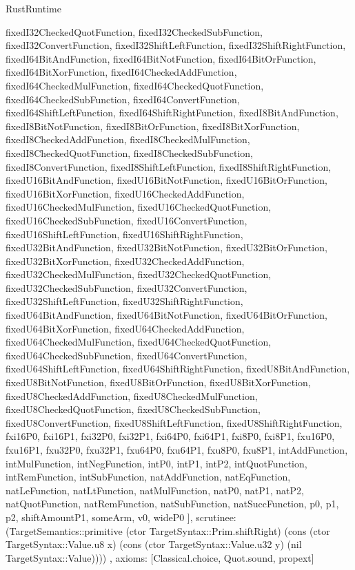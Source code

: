 \begin{lexlean}{RustRuntime}
\begin{semanticmodule}
{{      fixedI32CheckedQuotFunction,
      fixedI32CheckedSubFunction,
      fixedI32ConvertFunction,
      fixedI32ShiftLeftFunction,
      fixedI32ShiftRightFunction,
      fixedI64BitAndFunction,
      fixedI64BitNotFunction,
      fixedI64BitOrFunction,
      fixedI64BitXorFunction,
      fixedI64CheckedAddFunction,
      fixedI64CheckedMulFunction,
      fixedI64CheckedQuotFunction,
      fixedI64CheckedSubFunction,
      fixedI64ConvertFunction,
      fixedI64ShiftLeftFunction,
      fixedI64ShiftRightFunction,
      fixedI8BitAndFunction,
      fixedI8BitNotFunction,
      fixedI8BitOrFunction,
      fixedI8BitXorFunction,
      fixedI8CheckedAddFunction,
      fixedI8CheckedMulFunction,
      fixedI8CheckedQuotFunction,
      fixedI8CheckedSubFunction,
      fixedI8ConvertFunction,
      fixedI8ShiftLeftFunction,
      fixedI8ShiftRightFunction,
      fixedU16BitAndFunction,
      fixedU16BitNotFunction,
      fixedU16BitOrFunction,
      fixedU16BitXorFunction,
      fixedU16CheckedAddFunction,
      fixedU16CheckedMulFunction,
      fixedU16CheckedQuotFunction,
      fixedU16CheckedSubFunction,
      fixedU16ConvertFunction,
      fixedU16ShiftLeftFunction,
      fixedU16ShiftRightFunction,
      fixedU32BitAndFunction,
      fixedU32BitNotFunction,
      fixedU32BitOrFunction,
      fixedU32BitXorFunction,
      fixedU32CheckedAddFunction,
      fixedU32CheckedMulFunction,
      fixedU32CheckedQuotFunction,
      fixedU32CheckedSubFunction,
      fixedU32ConvertFunction,
      fixedU32ShiftLeftFunction,
      fixedU32ShiftRightFunction,
      fixedU64BitAndFunction,
      fixedU64BitNotFunction,
      fixedU64BitOrFunction,
      fixedU64BitXorFunction,
      fixedU64CheckedAddFunction,
      fixedU64CheckedMulFunction,
      fixedU64CheckedQuotFunction,
      fixedU64CheckedSubFunction,
      fixedU64ConvertFunction,
      fixedU64ShiftLeftFunction,
      fixedU64ShiftRightFunction,
      fixedU8BitAndFunction,
      fixedU8BitNotFunction,
      fixedU8BitOrFunction,
      fixedU8BitXorFunction,
      fixedU8CheckedAddFunction,
      fixedU8CheckedMulFunction,
      fixedU8CheckedQuotFunction,
      fixedU8CheckedSubFunction,
      fixedU8ConvertFunction,
      fixedU8ShiftLeftFunction,
      fixedU8ShiftRightFunction,
      fxi16P0,
      fxi16P1,
      fxi32P0,
      fxi32P1,
      fxi64P0,
      fxi64P1,
      fxi8P0,
      fxi8P1,
      fxu16P0,
      fxu16P1,
      fxu32P0,
      fxu32P1,
      fxu64P0,
      fxu64P1,
      fxu8P0,
      fxu8P1,
      intAddFunction,
      intMulFunction,
      intNegFunction,
      intP0,
      intP1,
      intP2,
      intQuotFunction,
      intRemFunction,
      intSubFunction,
      natAddFunction,
      natEqFunction,
      natLeFunction,
      natLtFunction,
      natMulFunction,
      natP0,
      natP1,
      natP2,
      natQuotFunction,
      natRemFunction,
      natSubFunction,
      natSuccFunction,
      p0,
      p1,
      p2,
      shiftAmountP1,
      someArm,
      v0,
      wideP0
    ],
    scrutinee: (TargetSemantics::primitive (ctor TargetSyntax::Prim.shiftRight) (cons (ctor TargetSyntax::Value.u8 x) (cons (ctor TargetSyntax::Value.u32 y) (nil TargetSyntax::Value))))
  },
  axioms: [Classical.choice, Quot.sound, propext]
}


\end{semanticmodule}
\end{lexlean}

